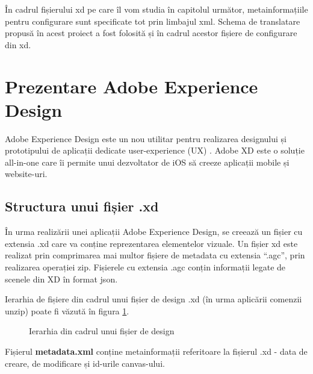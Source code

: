 În cadrul fișierului xd pe care îl vom studia în capitolul următor, metainformațiile pentru configurare sunt specificate tot prin limbajul xml. Schema de translatare propusă în acest proiect a fost folosită și în cadrul acestor fișiere de configurare din xd.

\section{Prezentare Adobe Experience Design}

Adobe Experience Design este un nou utilitar pentru realizarea designului și prototipului de aplicații dedicate user-experience (UX) \cite{xd}. Adobe XD este o soluție all-in-one care îi permite unui dezvoltator de iOS să creeze aplicații mobile și website-uri. 

\subsection{Structura unui fișier .xd}

În urma realizării unei aplicații Adobe Experience Design, se creează un fișier cu extensia .xd care va conține reprezentarea elementelor vizuale. 
Un fișier xd este realizat prin comprimarea mai multor fișiere de metadata cu extensia “.agc”, prin realizarea operației zip. Fișierele cu extensia .agc conțin informații legate de scenele din XD în format json.

Ierarhia de fișiere din cadrul unui fișier de design .xd (în urma aplicării comenzii unzip) poate fi văzută în figura \ref{fig:ierarhie}.

\begin{figure}[!htbp]
\caption{Ierarhia din cadrul unui fișier de design} \label{fig:ierarhie}
\end{figure}

Fișierul \textbf{metadata.xml} conține metainformații referitoare la fișierul .xd - data de creare, de modificare și id-urile canvas-ului.

